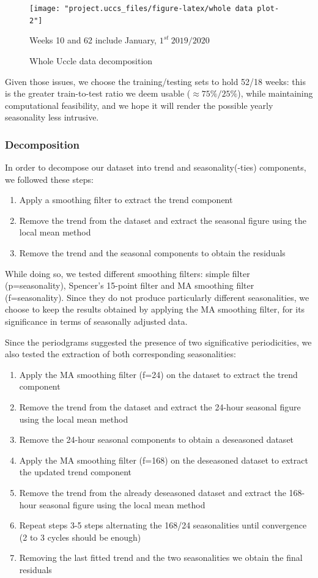 \documentclass[12pt]{article}
\begin{document}
\begin{figure}[h]
	\centering
	\texttt{[image: "project.uccs\_files/figure-latex/whole data plot-2"]}
	\caption{Whole Uccle data decomposition}{\footnotesize Weeks 10 and 62 include January, $1^{st}~2019/2020$}
	\label{fig:whole-data-decomposition}
\end{figure}

Given those issues, we choose the training/testing sets to hold 52/18 weeks: this is the greater train-to-test ratio we deem usable ($\approx 75\%/25\%$), while maintaining computational feasibility, and we hope it will render the possible yearly seasonality less intrusive.


\subsubsection{Decomposition}
In order to decompose our dataset into trend and seasonality(-ties) components, we followed these steps:
\begin{enumerate}[topsep=0.5em,itemsep=0em,partopsep=0.5em]
	\item Apply a smoothing filter to extract the trend component
	\item Remove the trend from the dataset and extract the seasonal figure using the local mean method
	\item Remove the trend and the seasonal components to obtain the residuals
\end{enumerate}
While doing so, we tested different smoothing filters: simple filter (p=seasonality), Spencer's 15-point filter and MA smoothing filter (f=seasonality). Since they do not produce particularly different seasonalities, we choose to keep the results obtained by applying the MA smoothing filter, for its significance in terms of seasonally adjusted data.

Since the periodgrams suggested the presence of two significative periodicities, we also tested the extraction of both corresponding seasonalities:
\begin{enumerate}[topsep=0.5em,itemsep=0em,partopsep=0.5em]
	\item Apply the MA smoothing filter (f=24) on the dataset to extract the trend component
	\item Remove the trend from the dataset and extract the 24-hour seasonal figure using the local mean method
	\item Remove the 24-hour seasonal components to obtain a deseasoned dataset
	\item Apply the MA smoothing filter (f=168) on the deseasoned dataset to extract the updated trend component
	\item Remove the trend from the already deseasoned dataset and extract the 168-hour seasonal figure using the local mean method
	\item Repeat steps 3-5 steps alternating the 168/24 seasonalities until convergence (2 to 3 cycles should be enough)
	\item Removing the last fitted trend and the two seasonalities we obtain the final residuals
\end{enumerate}
\end{document}
